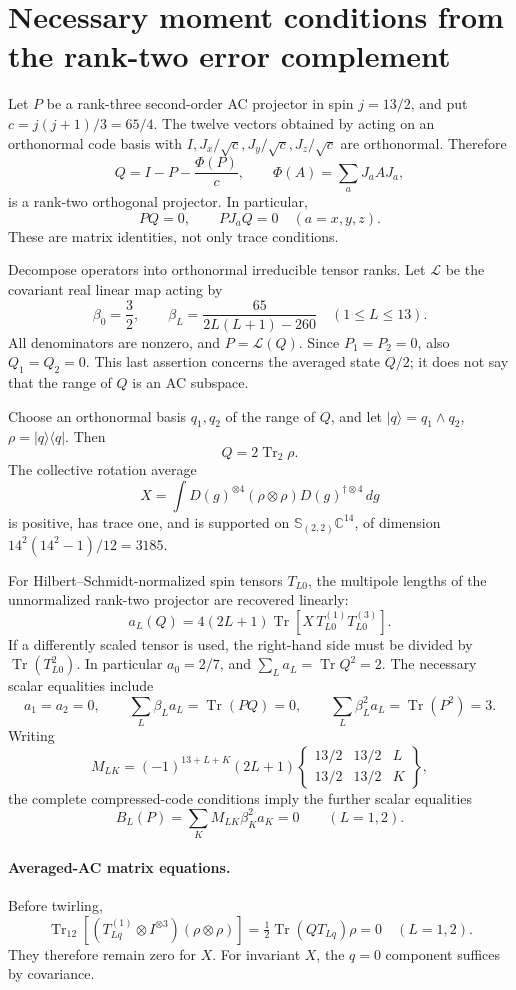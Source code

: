 \documentclass{article}
\newcommand{\Tr}{\operatorname{Tr}}
\begin{document}
\section*{Necessary moment conditions from the rank-two error complement}
Let $P$ be a rank-three second-order AC projector in spin $j=13/2$, and put $c=j(j+1)/3=65/4$. The twelve vectors obtained by acting on an orthonormal code basis with $I,J_x/\sqrt c,J_y/\sqrt c,J_z/\sqrt c$ are orthonormal. Therefore
\[
 Q=I-P-\frac{\Phi(P)}c,\qquad \Phi(A)=\sum_aJ_aAJ_a,
\]
is a rank-two orthogonal projector. In particular,
\[
 PQ=0,\qquad PJ_aQ=0\quad(a=x,y,z).
\]
These are matrix identities, not only trace conditions.

Decompose operators into orthonormal irreducible tensor ranks. Let $\mathcal L$ be the covariant real linear map acting by
\[
 \beta_0=\frac32,\qquad
 \beta_L=\frac{65}{2L(L+1)-260}\quad(1\le L\le13).
\]
All denominators are nonzero, and $P=\mathcal L(Q)$. Since $P_1=P_2=0$, also $Q_1=Q_2=0$. This last assertion concerns the averaged state $Q/2$; it does not say that the range of $Q$ is an AC subspace.

Choose an orthonormal basis $q_1,q_2$ of the range of $Q$, and let
$|q\rangle=q_1\wedge q_2$, $\rho=|q\rangle\langle q|$. Then
\[
 Q=2\Tr_2\rho.
\]
The collective rotation average
\[
 X=\int D(g)^{\otimes4}(\rho\otimes\rho)D(g)^{\dagger\otimes4}\,dg
\]
is positive, has trace one, and is supported on
$\mathbb S_{(2,2)}\mathbb C^{14}$, of dimension
$14^2(14^2-1)/12=3185$.

For Hilbert--Schmidt-normalized spin tensors $T_{L0}$, the multipole lengths of the unnormalized rank-two projector are recovered linearly:
\[
 a_L(Q)=4(2L+1)\Tr\!\left[X\,T_{L0}^{(1)}T_{L0}^{(3)}\right].
\]
If a differently scaled tensor is used, the right-hand side must be divided by $\Tr(T_{L0}^2)$. In particular $a_0=2/7$, and $\sum_La_L=\Tr Q^2=2$.
The necessary scalar equalities include
\[
 a_1=a_2=0,\qquad
 \sum_L\beta_La_L=\Tr(PQ)=0,\qquad
 \sum_L\beta_L^2a_L=\Tr(P^2)=3.
\]
Writing
\[
 M_{LK}=(-1)^{13+L+K}(2L+1)
 \begin{Bmatrix}13/2&13/2&L\\13/2&13/2&K\end{Bmatrix},
\]
the complete compressed-code conditions imply the further scalar equalities
\[
 B_L(P)=\sum_KM_{LK}\beta_K^2a_K=0\qquad(L=1,2).
\]

\paragraph{Averaged-AC matrix equations.}
Before twirling,
\[
 \Tr_{12}[(T_{Lq}^{(1)}\otimes I^{\otimes3})(\rho\otimes\rho)]
 =\tfrac12\Tr(QT_{Lq})\rho=0\quad(L=1,2).
\]
They therefore remain zero for $X$. For invariant $X$, the $q=0$ component suffices by covariance.
\end{document}
